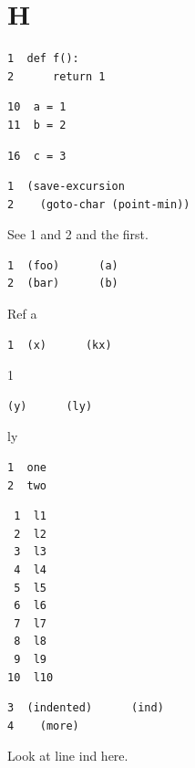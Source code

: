 \documentclass[11pt]{article}
\author{root}
\date{\today}
\title{}
\begin{document}
\tableofcontents

\section{H}
\label{sec:org8c58694}
\begin{verbatim}
1  def f():
2      return 1
\end{verbatim}

\begin{verbatim}
10  a = 1
11  b = 2
\end{verbatim}

\begin{verbatim}
16  c = 3
\end{verbatim}

\begin{verbatim}
1  (save-excursion
2    (goto-char (point-min))
\end{verbatim}
See 1 and 2 and the first.

\begin{verbatim}
1  (foo)      (a)
2  (bar)      (b)
\end{verbatim}
Ref a

\begin{verbatim}
1  (x)      (kx)
\end{verbatim}
1

\begin{verbatim}
(y)      (ly)
\end{verbatim}
ly

\begin{verbatim}
1  one
2  two
\end{verbatim}

\begin{verbatim}
 1  l1
 2  l2
 3  l3
 4  l4
 5  l5
 6  l6
 7  l7
 8  l8
 9  l9
10  l10
\end{verbatim}

\begin{verbatim}
3  (indented)      (ind)
4    (more)
\end{verbatim}
Look at line ind here.
\end{document}
